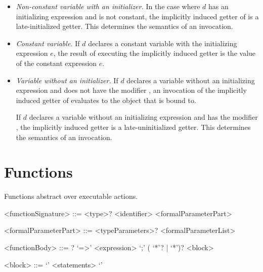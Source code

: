 \documentclass[makeidx]{article}
\begin{document}
\begin{itemize}
\item \emph{Non-constant variable with an initializer.}
  In the case where $d$ has an initializing expression and is not constant,
  the implicitly induced getter of \id{} is a late-initialized getter.
  This determines the semantics of an invocation.
\item \emph{Constant variable.}
  If $d$ declares a constant variable with the initializing expression $e$,
  the result of executing the implicitly induced getter is
  the value of the constant expression $e$.
\item \emph{Variable without an initializer.}
  If $d$ declares a variable \id{} without an initializing expression
  and does not have the modifier \LATE,
  an invocation of the implicitly induced getter of \id{} evaluates to
  the object that \id{} is bound to.


  If $d$ declares a variable \id{} without an initializing expression
  and has the modifier \LATE,
  the implicitly induced getter is a late-uninitialized getter.
  This determines the semantics of an invocation.
\end{itemize}

\vspace{-\baselineskip}\EndCase


\section{Functions}

\LMHash{}%
Functions abstract over executable actions.

\begin{grammar}
<functionSignature> ::= \gnewline{}
  <type>? <identifier> <formalParameterPart>

<formalParameterPart> ::= <typeParameters>? <formalParameterList>

<functionBody> ::= \ASYNC? `=>' <expression> `;'
  \alt (\ASYNC{} `*'? | \SYNC{} `*')? <block>

<block> ::= `{' <statements> `}'
\end{grammar}
\end{document}
